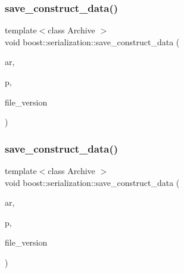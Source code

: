 \mbox{\label{namespaceboost_1_1serialization_a2bf21e44658422c6c8e8687dbe493534}} 
\subsubsection{\texorpdfstring{save\+\_\+construct\+\_\+data()}{save\_construct\_data()}\hspace{0.1cm}{\footnotesize\ttfamily [1/4]}}
{\footnotesize\ttfamily template$<$class Archive $>$ \\
void boost\+::serialization\+::save\+\_\+construct\+\_\+data (\begin{DoxyParamCaption}\item[{Archive \&}]{ar,  }\item[{const \hyperlink{classpan_1_1_card_impl}{pan\+::\+Card\+Impl}$<$ \hyperlink{namespacepan_a1f7350bfd0421afeabe9fa95c16fa811af0ddc0838281faf6d55e2cf840a2a8ef}{pan\+::\+Card\+Type\+::\+Infection} $>$ $\ast$}]{p,  }\item[{const unsigned int}]{file\+\_\+version }\end{DoxyParamCaption})\hspace{0.3cm}{\ttfamily [inline]}}

\mbox{\label{namespaceboost_1_1serialization_a4f15bc5acd6efbe9db67f1272d8f639b}} 
\subsubsection{\texorpdfstring{save\+\_\+construct\+\_\+data()}{save\_construct\_data()}\hspace{0.1cm}{\footnotesize\ttfamily [2/4]}}
{\footnotesize\ttfamily template$<$class Archive $>$ \\
void boost\+::serialization\+::save\+\_\+construct\+\_\+data (\begin{DoxyParamCaption}\item[{Archive \&}]{ar,  }\item[{const \hyperlink{classpan_1_1_card_impl}{pan\+::\+Card\+Impl}$<$ \hyperlink{namespacepan_a1f7350bfd0421afeabe9fa95c16fa811a57d056ed0984166336b7879c2af3657f}{pan\+::\+Card\+Type\+::\+City} $>$ $\ast$}]{p,  }\item[{const unsigned int}]{file\+\_\+version }\end{DoxyParamCaption})\hspace{0.3cm}{\ttfamily [inline]}}

